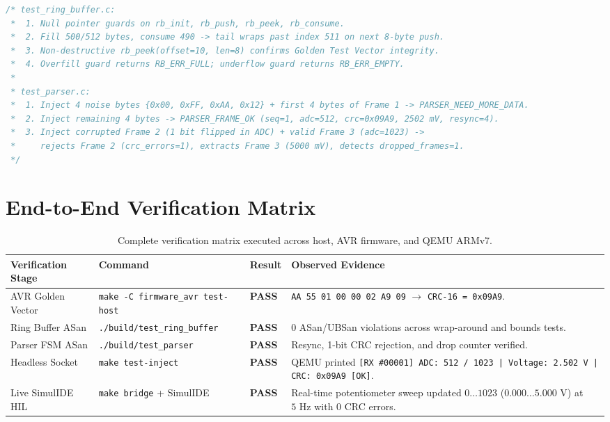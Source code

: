 \documentclass[11pt,a4paper,oneside]{report}
\begin{document}
\begin{lstlisting}[language=C,caption={Summary of verified scenarios in \texttt{tests/test\_ring\_buffer.c} and \texttt{tests/test\_parser.c}.}]
/* test_ring_buffer.c:
 *  1. Null pointer guards on rb_init, rb_push, rb_peek, rb_consume.
 *  2. Fill 500/512 bytes, consume 490 -> tail wraps past index 511 on next 8-byte push.
 *  3. Non-destructive rb_peek(offset=10, len=8) confirms Golden Test Vector integrity.
 *  4. Overfill guard returns RB_ERR_FULL; underflow guard returns RB_ERR_EMPTY.
 *
 * test_parser.c:
 *  1. Inject 4 noise bytes {0x00, 0xFF, 0xAA, 0x12} + first 4 bytes of Frame 1 -> PARSER_NEED_MORE_DATA.
 *  2. Inject remaining 4 bytes -> PARSER_FRAME_OK (seq=1, adc=512, crc=0x09A9, 2502 mV, resync=4).
 *  3. Inject corrupted Frame 2 (1 bit flipped in ADC) + valid Frame 3 (adc=1023) ->
 *     rejects Frame 2 (crc_errors=1), extracts Frame 3 (5000 mV), detects dropped_frames=1.
 */
\end{lstlisting}

\section{End-to-End Verification Matrix}

\begin{table}[!htbp]
\centering
\caption{Complete verification matrix executed across host, AVR firmware, and QEMU ARMv7.}
\label{tab:ch8_matrix}
\begin{tabularx}{\linewidth}{l l l X}
\toprule
\textbf{Verification Stage} & \textbf{Command} & \textbf{Result} & \textbf{Observed Evidence} \\
\midrule
AVR Golden Vector & \texttt{make -C firmware\_avr test-host} & \textbf{PASS} & \texttt{AA 55 01 00 00 02 A9 09} $\rightarrow$ \texttt{CRC-16 = 0x09A9}. \\
Ring Buffer ASan & \texttt{./build/test\_ring\_buffer} & \textbf{PASS} & 0 ASan/UBSan violations across wrap-around and bounds tests. \\
Parser FSM ASan & \texttt{./build/test\_parser} & \textbf{PASS} & Resync, 1-bit CRC rejection, and drop counter verified. \\
Headless Socket & \texttt{make test-inject} & \textbf{PASS} & QEMU printed \texttt{[RX \#00001] ADC: 512 / 1023 | Voltage: 2.502 V | CRC: 0x09A9 [OK]}. \\
Live SimulIDE HIL & \texttt{make bridge} + SimulIDE & \textbf{PASS} & Real-time potentiometer sweep updated $0\dots 1023$ ($0.000\dots 5.000\text{ V}$) at $5\text{ Hz}$ with 0 CRC errors. \\
\bottomrule
\end{tabularx}
\end{table}
\end{document}
